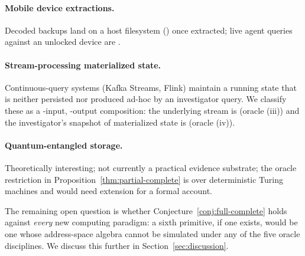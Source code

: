 \paragraph{Mobile device extractions.} Decoded backups land on a host
filesystem () once extracted; live agent queries against an unlocked
device are .

\paragraph{Stream-processing materialized state.} Continuous-query systems
(Kafka Streams, Flink) maintain a running state that is neither persisted
nor produced ad-hoc by an investigator query. We classify these as a
-input, -output composition: the underlying stream is 
(oracle (iii)) and the investigator's snapshot of materialized state is
 (oracle (iv)).

\paragraph{Quantum-entangled storage.} Theoretically interesting; not
currently a practical evidence substrate; the oracle restriction in
Proposition~\ref{thm:partial-complete} is over deterministic Turing machines
and would need extension for a formal account.

The remaining open question is whether Conjecture~\ref{conj:full-complete}
holds against \emph{every} new computing paradigm: a sixth primitive, if
one exists, would be one whose address-space algebra cannot be simulated
under any of the five oracle disciplines. We discuss this further in
Section~\ref{sec:discussion}.
